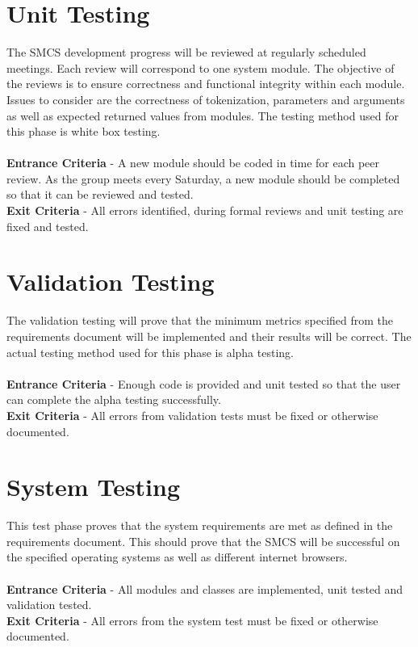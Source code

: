 \documentclass{scrreprt}
\begin{document}
	\section{Unit Testing}
	The SMCS development progress will be reviewed at regularly scheduled meetings. Each review will correspond to one system module. The objective of the reviews is to ensure correctness and functional integrity within each module. Issues to consider are the correctness of tokenization, parameters and arguments as well as expected returned values from modules. The testing method used for this phase is white box testing.\\\\
	\textbf{Entrance Criteria} - A new  module should be coded in time for each peer review. As the group meets every Saturday, a new module should be completed so that it can be reviewed and tested.\\
	\textbf{Exit Criteria} - All errors identified, during formal reviews and unit testing are fixed and tested.
	
	\section{Validation Testing}
	The validation testing will prove that the minimum metrics specified from the requirements document will be implemented and their results will be correct. The actual testing method used for this phase is alpha testing.\\\\
	\textbf{Entrance Criteria} - Enough code is provided and unit tested so that the user can complete the alpha testing successfully.\\
	\textbf{Exit Criteria} - All errors from validation tests must be fixed or otherwise documented.
	
	\section{System Testing}
	This test phase proves that the system requirements are met as defined in the requirements document. This should prove that the SMCS will be successful on the specified operating systems as well as different internet browsers.\\\\
	\textbf{Entrance Criteria} - All modules and classes are implemented, unit tested and validation tested.\\
	\textbf{Exit Criteria} - All errors from the system test must be fixed or otherwise documented.
	
\end{document}
